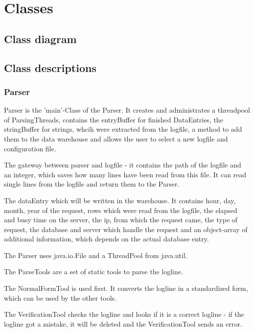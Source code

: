 \section{Classes}

\subsection{Class diagram}

\subsection{Class descriptions}

\subsubsection{Parser}

Parser is the 'main'-Class of the Parser. It creates and administrates a threadpool of ParsingThreads,
contains the entryBuffer for finished DataEntries, the stringBuffer for strings, whcih were extracted
from the logfile, a method to add them to the data warehouse
and allows the user to select a new logfile and configuration file.

The gateway between parser and logfile - it contains the path of the logfile and an integer, 
which saves how many lines have been read from this file. It can read single lines from the logfile and return them to 
the Parser.

The dataEntry which will be written in the warehouse. It contains hour, day, month, year of the request, rows which were read 
from the logfile, the elapsed and busy time on the server, the ip, from which the request came, the type of request, the database
and server which handle the request and an object-array of additional information, which depends on the actual database entry.

The Parser uses java.io.File and a ThreadPool from java.util.

The ParseTools are a set of static tools to parse the logline.

The NormalFormTool is used first. It converts the logline in a standardized form, which can be used by the other tools.

The VerificationTool checks the logline and looks if it is a correct logline - if the logline got a mistake, it will 
be deleted and the VerificationTool sends an error.



